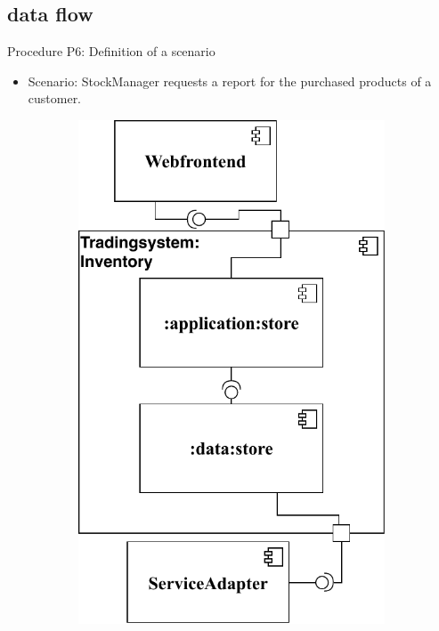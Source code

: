 \documentclass[18pt]{beamer}
\begin{document}
\subsection{data flow}
\begin{frame}{Procedure P6: Definition of a scenario}
\begin{itemize}
\item Scenario: StockManager requests a report for the purchased products of a customer.
\end{itemize}
\begin{figure}
\begin{subfigure}{.4\textwidth}
\includegraphics[scale=0.35]{logos/PickUpShopPresentation.pdf}

\end{subfigure}
\end{figure}
\end{frame}
\end{document}
